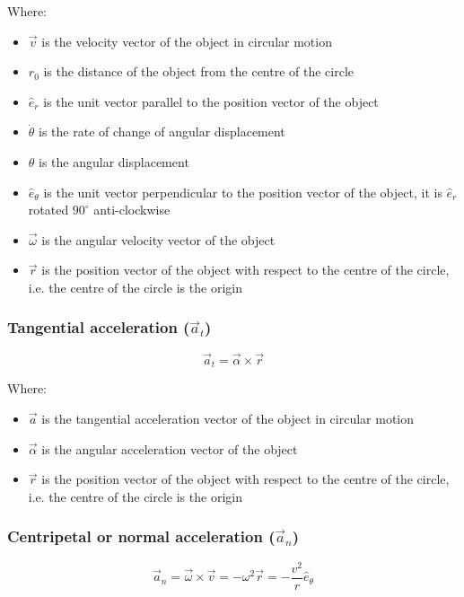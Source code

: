 \documentclass[11pt]{article}
\begin{document}
Where:
\begin{itemize}
\item \(\vec{v}\) is the velocity vector of the object in circular motion
\item \(r_0\) is the distance of the object from the centre of the circle
\item \(\hat{e}_r\) is the unit vector parallel to the position vector of the object
\item \(\dot{\theta}\) is the rate of change of angular displacement
\item \(\theta\) is the angular displacement
\item \(\hat{e}_{\theta}\) is the unit vector perpendicular to the position vector of the object, it is \(\hat{e}_r\) rotated \(90^{\circ}\) anti-clockwise
\item \(\vec{\omega}\) is the angular velocity vector of the object
\item \(\vec{r}\) is the position vector of the object with respect to the centre of the circle, i.e. the centre of the circle is the origin
\end{itemize}
\subsubsection{Tangential acceleration (\(\vec{a}_t\))}
\label{sec:org92206ab}
\[\vec{a}_t = \vec{\alpha} \times \vec{r}\]

Where:
\begin{itemize}
\item \(\vec{a}\) is the tangential acceleration vector of the object in circular motion
\item \(\vec{\alpha}\) is the angular acceleration vector of the object
\item \(\vec{r}\) is the position vector of the object with respect to the centre of the circle, i.e. the centre of the circle is the origin
\end{itemize}

 \newpage
\subsubsection{Centripetal or normal acceleration (\(\vec{a}_n\))}
\label{sec:orgb5b6849}
\[\vec{a}_n = \vec{\omega} \times \vec{v} = - \omega^2 \vec{r} = - \frac{v^2}{r} \hat{e}_{\theta}\]
\end{document}
